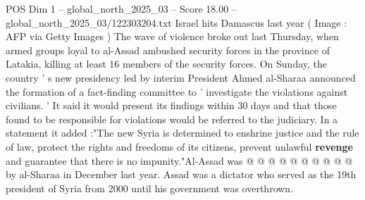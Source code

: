 \begin{textsample}{POS Dim 1 – global\_north\_2025\_03 – Score 18.00 – global\_north\_2025\_03/122303204.txt}
Israel hits Damascus last year ( Image : AFP via Getty Images ) The wave of violence broke out last Thursday, when armed groups loyal to al-Assad ambushed security forces in the province of Latakia, killing at least 16 members of the security forces.
On Sunday, the country ' s new presidency led by interim President Ahmed al-Sharaa announced the formation of a fact-finding committee to ' investigate the violations against civilians. ' It said it would present its findings within 30 days and that those found to be responsible for violations would be referred to the judiciary.
In a statement it added :"The new Syria is determined to enshrine justice and the rule of law, protect the rights and freedoms of its citizens, prevent unlawful \textbf{revenge} and guarantee that there is no impunity."Al-Assad was @ @ @ @ @ @ @ @ @ @ by al-Sharaa in December last year.
Assad was a dictator who served as the 19th president of Syria from 2000 until his government was overthrown.

\end{textsample}
